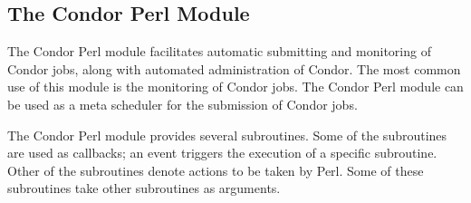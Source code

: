 \subsection{\label{condor-pm} The Condor Perl Module}

The Condor Perl module facilitates automatic submitting and monitoring of
Condor jobs, along with automated administration of Condor.
The most common
use of this module is the monitoring of Condor jobs.
The Condor Perl module can be used as a meta scheduler for the submission
of Condor jobs.

The Condor Perl module provides several subroutines.
Some of the subroutines are used as callbacks;
an event triggers the execution of a specific subroutine.
Other of the subroutines denote actions to be taken by Perl.
Some of these subroutines take other subroutines as arguments.

